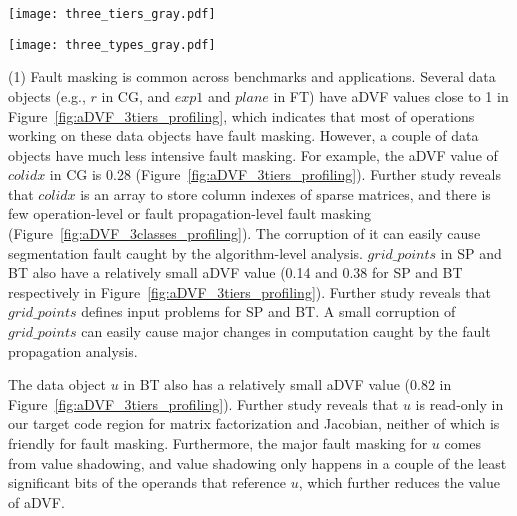 \begin{figure*}
	\centering
        \texttt{[image: three\_tiers\_gray.pdf]}
%
        \vspace{-5pt}
        \caption{The breakdown of aDVF results based on the three level analysis. The $x$ axis is the data object name.}
        \vspace{-8pt}
        \label{fig:aDVF_3tiers_profiling}
\end{figure*}


\begin{figure*}
	\centering
	\texttt{[image: three\_types\_gray.pdf]}
	\vspace{-5pt}
	\caption{The breakdown of aDVF results based on the three classes of fault masking. The $x$ axis is the data object name. \textit{zeta} and \textit{elemBC} in LULESH are \textit{m\_delv\_zeta} and \textit{m\_elemBC} respectively.} %
	\vspace{-5pt}
	\label{fig:aDVF_3classes_profiling}
\end{figure*}

(1) Fault masking is common across benchmarks and applications.
Several data objects (e.g., $r$ in CG, and $exp1$ and $plane$ in FT)
have aDVF values close to 1 in Figure~\ref{fig:aDVF_3tiers_profiling}, 
which indicates that most of operations working on these data objects
have fault masking.
However, a couple of data objects have much less intensive fault masking.
For example, the aDVF value of $colidx$ in CG is 0.28 (Figure~\ref{fig:aDVF_3tiers_profiling}). 
Further study reveals that $colidx$ is an array to store column indexes of sparse matrices, and there is few operation-level or fault propagation-level fault masking  (Figure~\ref{fig:aDVF_3classes_profiling}).
The corruption of it can easily cause segmentation fault caught by the
algorithm-level analysis. 
$grid\_points$ in SP and BT also have a relatively small aDVF value (0.14 and 0.38 for SP and BT respectively in Figure~\ref{fig:aDVF_3tiers_profiling}).
Further study reveals that $grid\_points$ defines input problems for SP and BT. 
A small corruption of $grid\_points$ 
can easily cause major changes in computation
caught by the fault propagation analysis. 

The data object $u$ in BT also has a relatively small aDVF value (0.82 in Figure~\ref{fig:aDVF_3tiers_profiling}).
Further study reveals that $u$ is read-only in our target code region
for matrix factorization and Jacobian, neither of which is friendly
for fault masking.
Furthermore, the major fault masking for $u$ comes from value shadowing,
and value shadowing only happens in a couple of the least significant bits 
of the operands that reference $u$, which further reduces the value of aDVF.

